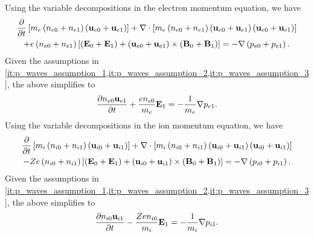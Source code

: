 \documentclass[a4paper,11pt]{report}
\begin{document}
Using the variable decompositions in the electron momentum equation, we have 
\begin{multline*}
    \frac{\partial}{\partial t} \left [ m_e \left ( n_{e0} + n_{e1} \right ) \left ( \mathbf{u}_{e0} + \mathbf{u}_{e1} \right ) \right ] + \nabla \cdot \left [ m_e \left ( n_{e0} + n_{e1} \right ) \left ( \mathbf{u}_{e0} + \mathbf{u}_{e1} \right ) \left ( \mathbf{u}_{e0} + \mathbf{u}_{e1} \right ) \right ] \\
    + e \left ( n_{e0} + n_{e1} \right ) \left [ \left ( \mathbf{E}_0 + \mathbf{E}_1 \right ) + \left ( \mathbf{u}_{e0} + \mathbf{u}_{e1} \right ) \times \left ( \mathbf{B}_0 + \mathbf{B}_1 \right ) \right ] = -\nabla \left ( p_{e0} + p_{e1} \right ).
\end{multline*}
Given the assumptions in \cref{it:p_waves_assumption_1,it:p_waves_assumption_2,it:p_waves_assumption_3}, the above simplifies to
\begin{equation}
    \label{eq:p_waves_e_mom_linearized}
    \frac{\partial n_{e0} \mathbf{u}_{e1}}{\partial t} + \frac{e n_{e0}}{m_e} \mathbf{E}_1 = - \frac{1}{m_e} \nabla p_{e1} .
\end{equation}
Using the variable decompositions in the ion momentum equation, we have 
\begin{multline*}
    \frac{\partial}{\partial t} \left [ m_i \left ( n_{i0} + n_{i1} \right ) \left ( \mathbf{u}_{i0} + \mathbf{u}_{i1} \right ) \right ] + \nabla \cdot \left [ m_i \left ( n_{i0} + n_{i1} \right ) \left ( \mathbf{u}_{i0} + \mathbf{u}_{i1} \right ) \left ( \mathbf{u}_{i0} + \mathbf{u}_{i1} \right ) \right ] \\
    - Z e \left ( n_{i0} + n_{i1} \right ) \left [ \left ( \mathbf{E}_0 + \mathbf{E}_1 \right ) + \left ( \mathbf{u}_{i0} + \mathbf{u}_{i1} \right ) \times \left ( \mathbf{B}_0 + \mathbf{B}_1 \right ) \right ] = -\nabla \left ( p_{i0} + p_{i1} \right ).
\end{multline*}
Given the assumptions in \cref{it:p_waves_assumption_1,it:p_waves_assumption_2,it:p_waves_assumption_3}, the above simplifies to
\begin{equation}
    \label{eq:p_waves_i_mom_linearized}
    \frac{\partial n_{i0} \mathbf{u}_{i1}}{\partial t} - \frac{Z e n_{i0}}{m_i} \mathbf{E}_1 = - \frac{1}{m_i}\nabla p_{i1}.
\end{equation}
\end{document}

